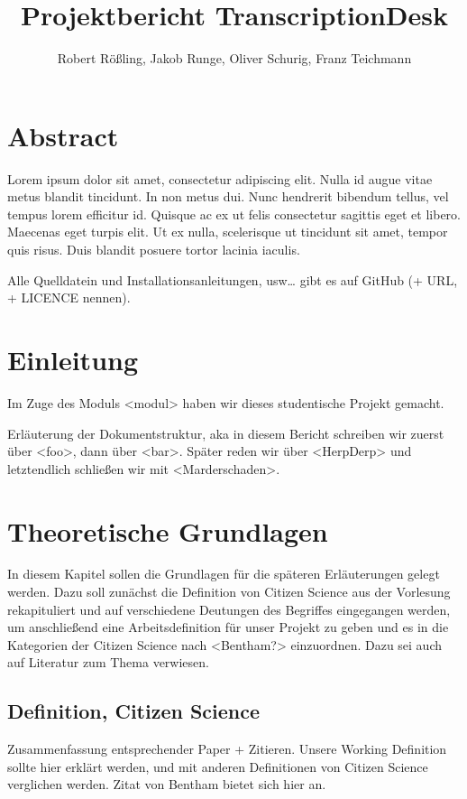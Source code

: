 \documentclass{article}
\title{Projektbericht TranscriptionDesk}
\author{Robert Rößling, Jakob Runge, Oliver Schurig, Franz Teichmann}
\begin{document}

\maketitle

\section*{Abstract}
Lorem ipsum dolor sit amet, consectetur adipiscing elit. Nulla id augue vitae metus blandit tincidunt. In non metus dui. Nunc hendrerit bibendum tellus, vel tempus lorem efficitur id. Quisque ac ex ut felis consectetur sagittis eget et libero. Maecenas eget turpis elit. Ut ex nulla, scelerisque ut tincidunt sit amet, tempor quis risus. Duis blandit posuere tortor lacinia iaculis.

Alle Quelldatein und Installationsanleitungen, usw… gibt es auf GitHub (+ URL, + LICENCE nennen).

\tableofcontents
\newpage
\section{Einleitung}
Im Zuge des Moduls <modul> haben wir dieses studentische Projekt gemacht.

Erläuterung der Dokumentstruktur, aka in diesem Bericht schreiben wir zuerst über <foo>, dann über <bar>.
Später reden wir über <HerpDerp> und letztendlich schließen wir mit <Marderschaden>.
\section{Theoretische Grundlagen}
In diesem Kapitel sollen die Grundlagen für die späteren Erläuterungen gelegt werden. Dazu soll zunächst die Definition von Citizen Science aus der Vorlesung rekapituliert und auf verschiedene Deutungen des Begriffes eingegangen werden, um anschließend eine Arbeitsdefinition für unser Projekt zu geben und es in die Kategorien der Citizen Science nach <Bentham?> einzuordnen. Dazu sei auch auf Literatur zum Thema verwiesen.
\subsection{Definition, Citizen Science}
Zusammenfassung entsprechender Paper + Zitieren.
Unsere Working Definition sollte hier erklärt werden,
und mit anderen Definitionen von Citizen Science verglichen werden.
Zitat von Bentham bietet sich hier an.
\end{document}
